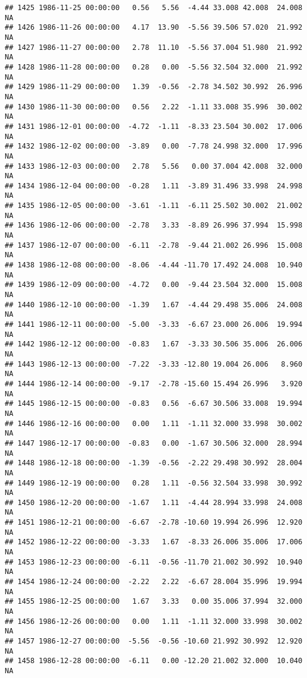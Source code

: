 \documentclass{article}\usepackage{graphicx, color}
\makeatletter
\newenvironment{kframe}{%
 \def\at@end@of@kframe{}%
 \ifinner\ifhmode%
  \def\at@end@of@kframe{\end{minipage}}%
  \begin{minipage}{\columnwidth}%
 \fi\fi%
 \def\FrameCommand##1{\hskip\@totalleftmargin \hskip-\fboxsep
 \colorbox{shadecolor}{##1}\hskip-\fboxsep
     \hskip-\linewidth \hskip-\@totalleftmargin \hskip\columnwidth}%
 \MakeFramed {\advance\hsize-\width
   \@totalleftmargin\z@ \linewidth\hsize
   \@setminipage}}%
 {\par\unskip\endMakeFramed%
 \at@end@of@kframe}
\newenvironment{knitrout}{}{} %
\makeatother
\begin{document}
\begin{knitrout}
\begin{kframe}
\begin{verbatim}
## 1425 1986-11-25 00:00:00   0.56   5.56  -4.44 33.008 42.008  24.008     NA
## 1426 1986-11-26 00:00:00   4.17  13.90  -5.56 39.506 57.020  21.992     NA
## 1427 1986-11-27 00:00:00   2.78  11.10  -5.56 37.004 51.980  21.992     NA
## 1428 1986-11-28 00:00:00   0.28   0.00  -5.56 32.504 32.000  21.992     NA
## 1429 1986-11-29 00:00:00   1.39  -0.56  -2.78 34.502 30.992  26.996     NA
## 1430 1986-11-30 00:00:00   0.56   2.22  -1.11 33.008 35.996  30.002     NA
## 1431 1986-12-01 00:00:00  -4.72  -1.11  -8.33 23.504 30.002  17.006     NA
## 1432 1986-12-02 00:00:00  -3.89   0.00  -7.78 24.998 32.000  17.996     NA
## 1433 1986-12-03 00:00:00   2.78   5.56   0.00 37.004 42.008  32.000     NA
## 1434 1986-12-04 00:00:00  -0.28   1.11  -3.89 31.496 33.998  24.998     NA
## 1435 1986-12-05 00:00:00  -3.61  -1.11  -6.11 25.502 30.002  21.002     NA
## 1436 1986-12-06 00:00:00  -2.78   3.33  -8.89 26.996 37.994  15.998     NA
## 1437 1986-12-07 00:00:00  -6.11  -2.78  -9.44 21.002 26.996  15.008     NA
## 1438 1986-12-08 00:00:00  -8.06  -4.44 -11.70 17.492 24.008  10.940     NA
## 1439 1986-12-09 00:00:00  -4.72   0.00  -9.44 23.504 32.000  15.008     NA
## 1440 1986-12-10 00:00:00  -1.39   1.67  -4.44 29.498 35.006  24.008     NA
## 1441 1986-12-11 00:00:00  -5.00  -3.33  -6.67 23.000 26.006  19.994     NA
## 1442 1986-12-12 00:00:00  -0.83   1.67  -3.33 30.506 35.006  26.006     NA
## 1443 1986-12-13 00:00:00  -7.22  -3.33 -12.80 19.004 26.006   8.960     NA
## 1444 1986-12-14 00:00:00  -9.17  -2.78 -15.60 15.494 26.996   3.920     NA
## 1445 1986-12-15 00:00:00  -0.83   0.56  -6.67 30.506 33.008  19.994     NA
## 1446 1986-12-16 00:00:00   0.00   1.11  -1.11 32.000 33.998  30.002     NA
## 1447 1986-12-17 00:00:00  -0.83   0.00  -1.67 30.506 32.000  28.994     NA
## 1448 1986-12-18 00:00:00  -1.39  -0.56  -2.22 29.498 30.992  28.004     NA
## 1449 1986-12-19 00:00:00   0.28   1.11  -0.56 32.504 33.998  30.992     NA
## 1450 1986-12-20 00:00:00  -1.67   1.11  -4.44 28.994 33.998  24.008     NA
## 1451 1986-12-21 00:00:00  -6.67  -2.78 -10.60 19.994 26.996  12.920     NA
## 1452 1986-12-22 00:00:00  -3.33   1.67  -8.33 26.006 35.006  17.006     NA
## 1453 1986-12-23 00:00:00  -6.11  -0.56 -11.70 21.002 30.992  10.940     NA
## 1454 1986-12-24 00:00:00  -2.22   2.22  -6.67 28.004 35.996  19.994     NA
## 1455 1986-12-25 00:00:00   1.67   3.33   0.00 35.006 37.994  32.000     NA
## 1456 1986-12-26 00:00:00   0.00   1.11  -1.11 32.000 33.998  30.002     NA
## 1457 1986-12-27 00:00:00  -5.56  -0.56 -10.60 21.992 30.992  12.920     NA
## 1458 1986-12-28 00:00:00  -6.11   0.00 -12.20 21.002 32.000  10.040     NA

\end{verbatim}
\end{kframe}
\end{knitrout}
\end{document}
